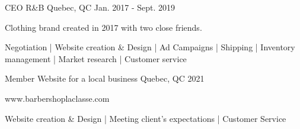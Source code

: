 

\begin{cventries}

  \cventry
    {CEO} %
    {R\&B} %
    {Quebec, QC} %
    {Jan. 2017 - Sept. 2019} %
    {
      \begin{cvitems} %
        \item {Clothing brand created in 2017 with two close friends.}
        \item {Negotiation | Website creation \& Design | Ad Campaigns | Shipping | Inventory management | Market research | Customer service}
      \end{cvitems}
    }

  \cventry
    {Member} %
    {Website for a local business} %
    {Quebec, QC} %
    {2021} %
    {
      \begin{cvitems} %
        \item {www.barbershoplaclasse.com}
        \item {Website creation \& Design | Meeting client's expectations | Customer Service}
      \end{cvitems}
    }

\end{cventries}